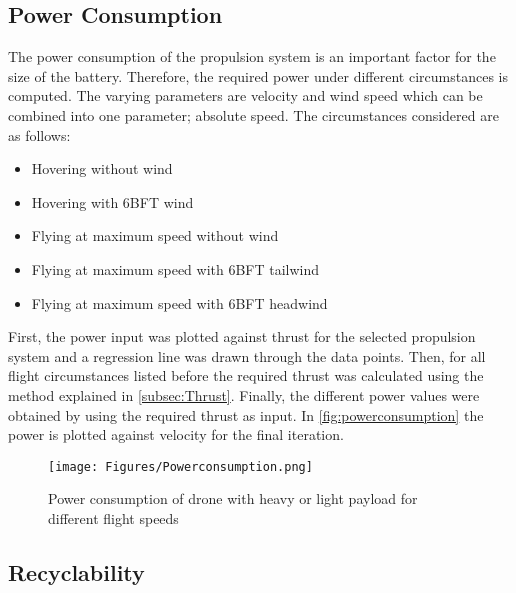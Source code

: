 \subsection{Power Consumption}
\label{subsec:powerreq}
The power consumption of the propulsion system is an important factor for the size of the battery. Therefore, the required power under different circumstances is computed. The varying parameters are velocity and wind speed which can be combined into one parameter; absolute speed. The circumstances considered are as follows: 

\begin{itemize}[noitemsep,nolistsep]
    \item Hovering without wind
    \item Hovering with 6BFT wind
    \item Flying at maximum speed without wind
    \item Flying at maximum speed with 6BFT tailwind
    \item Flying at maximum speed with 6BFT headwind
\end{itemize}

First, the power input was plotted against thrust for the selected propulsion system and a regression line was drawn through the data points. Then, for all flight circumstances listed before the required thrust was calculated using the method explained in \autoref{subsec:Thrust}. Finally, the different power values were obtained by using the required thrust as input. In \autoref{fig:powerconsumption} the power is plotted against velocity for the final iteration.

\begin{figure}[h]
    \centering
    \texttt{[image: Figures/Powerconsumption.png]}
    \caption{Power consumption of drone with heavy or light payload for different flight speeds}
    \label{fig:powerconsumption}
\end{figure}

\subsection{Recyclability}
\label{sub:recyclability}

